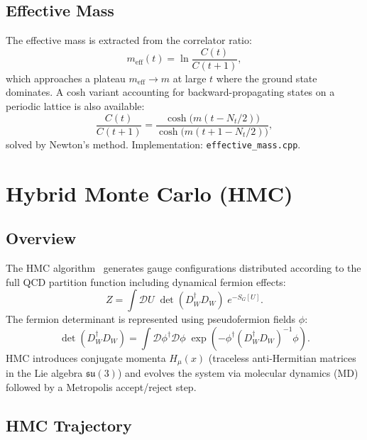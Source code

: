 \documentclass[12pt]{article}
\newcommand{\code}[1]{\texttt{#1}}
\begin{document}
\subsection{Effective Mass}

The effective mass is extracted from the correlator ratio:
\begin{equation}
\label{eq:meff}
m_{\mathrm{eff}}(t) = \ln \frac{C(t)}{C(t+1)},
\end{equation}
which approaches a plateau $m_{\mathrm{eff}} \to m$ at large $t$ where the ground state dominates. A cosh variant accounting for backward-propagating states on a periodic lattice is also available:
\begin{equation}
\frac{C(t)}{C(t+1)} = \frac{\cosh\!\big(m(t - N_t/2)\big)}{\cosh\!\big(m(t + 1 - N_t/2)\big)},
\end{equation}
solved by Newton's method. Implementation: \code{effective\_mass.cpp}.


\section{Hybrid Monte Carlo (HMC)}
\label{sec:hmc}

\subsection{Overview}

The HMC algorithm~\cite{Duane1987} generates gauge configurations distributed according to the full QCD partition function including dynamical fermion effects:
\begin{equation}
Z = \int \mathcal{D}U \; \det(D_W^\dagger D_W) \; e^{-S_G[U]}.
\end{equation}
The fermion determinant is represented using pseudofermion fields $\phi$:
\begin{equation}
\det(D_W^\dagger D_W) = \int \mathcal{D}\phi^\dagger \mathcal{D}\phi \; \exp\!\left(-\phi^\dagger (D_W^\dagger D_W)^{-1} \phi\right).
\end{equation}
HMC introduces conjugate momenta $H_\mu(x)$ (traceless anti-Hermitian matrices in the Lie algebra $\mathfrak{su}(3)$) and evolves the system via molecular dynamics (MD) followed by a Metropolis accept/reject step.

\subsection{HMC Trajectory}
\end{document}
